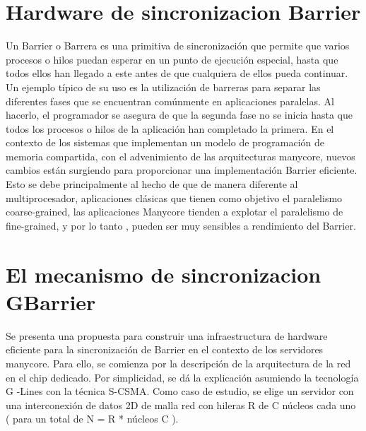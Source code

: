 \documentclass[conference]{IEEEtran}
\begin{document}
\section{Hardware de sincronizacion Barrier}
Un Barrier o Barrera es una primitiva de sincronización que permite que varios procesos o hilos puedan
esperar en un punto de ejecución especial, hasta que todos ellos han llegado a este antes de que cualquiera
de ellos pueda continuar. Un ejemplo típico de su uso es la utilización de barreras para separar
las diferentes fases que se encuentran comúnmente en aplicaciones paralelas. Al hacerlo, el
programador se asegura de que la segunda fase no se inicia hasta que todos los procesos o hilos
de la aplicación han completado la primera.
En el contexto de los sistemas que implementan un modelo de programación de memoria compartida, con el advenimiento de las arquitecturas manycore, nuevos cambios están surgiendo para proporcionar una implementación Barrier eficiente. Esto se debe principalmente al hecho de que de manera diferente al multiprocesador, aplicaciones clásicas que tienen como objetivo el paralelismo coarse-grained, las aplicaciones Manycore tienden a explotar el paralelismo de fine-grained, y por lo tanto , pueden ser muy sensibles a rendimiento del Barrier.


\section{El mecanismo de sincronizacion GBarrier}
Se presenta una propuesta para construir una infraestructura de hardware eficiente
para la sincronización de Barrier en el contexto de los servidores manycore. Para ello, se comienza por
la descripción de la arquitectura de la red en el chip dedicado. Por simplicidad, se dá la explicación asumiendo la tecnología G -Lines con
la técnica S-CSMA. Como caso de estudio, se elige un servidor con una interconexión de datos 2D de malla
red con hileras R de C núcleos cada uno ( para un total de N = R * núcleos C ). 



\end{document}
